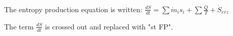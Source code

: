 The entropy production equation is written:  
\( \frac{dS}{dt} = \sum \dot{m}_i s_i + \sum \frac{\dot{Q}}{T} + \dot{S}_{erz} \)  

The term \( \frac{dS}{dt} \) is crossed out and replaced with "st FP".